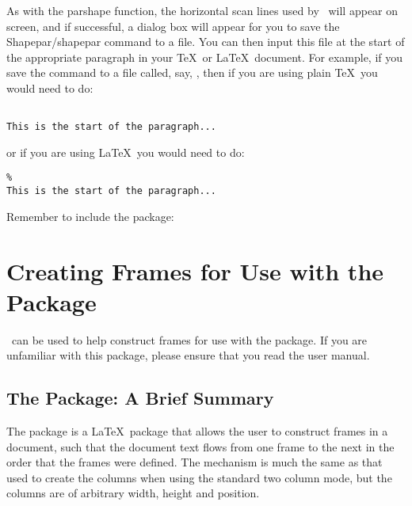 As with the parshape function, the horizontal
scan lines used by \FlowframTk\ will appear on screen, and if
successful, a dialog box will appear for you to save the
\gls{Shapepar}\slash\gls{shapepar} command to a file. You can then input this
file at the start of the appropriate paragraph in your \TeX\ or
\LaTeX\ document. For example, if you save the
command to a file called, say, , then if
you are using plain \TeX\ you would need to do:
\begin{verbatim}

This is the start of the paragraph...
\end{verbatim}
or if you are using \LaTeX\ you would need to do:
\begin{verbatim}
%
This is the start of the paragraph...
\end{verbatim}
Remember to include the  package:



\section{Creating Frames for Use with the  Package}
\label{sec:flowframe}


\FlowframTk\ can be used to help construct frames for use with the
 package. If you are unfamiliar with this
package, please ensure that you read the user manual.

\subsection{The  Package: A Brief Summary}
\label{sec:flowframesummary}

The  package is a \LaTeX\ package that allows
the user to construct frames in a document, such that the document
text flows from one frame to the next in the order that the
frames were defined. The mechanism is much the same as that used
to create the columns when using the standard two column mode, but
the columns are of arbitrary width, height and position.

